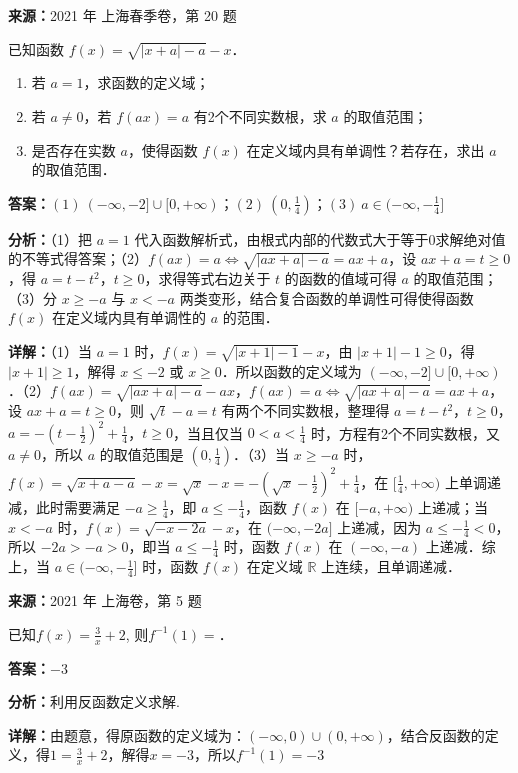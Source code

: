 \begin{question}[points=16]
\textbf{来源：}2021 年 上海春季卷，第 20 题\par
已知函数 $f(x)=\sqrt{|x+a|-a}-x$．\begin{enumerate}\item[(1)] 若 $a=1$，求函数的定义域；\item[(2)] 若 $a\neq 0$，若 $f(ax)=a$ 有2个不同实数根，求 $a$ 的取值范围；\item[(3)] 是否存在实数 $a$，使得函数 $f(x)$ 在定义域内具有单调性？若存在，求出 $a$ 的取值范围．\end{enumerate}
\begin{solution}
\textbf{答案：}$(1)\ (-\infty,-2]\cup[0,+\infty)$；$(2)\ (0,\frac{1}{4})$；$(3)\ a\in(-\infty,-\frac{1}{4}]$

\textbf{分析：}（1）把 $a=1$ 代入函数解析式，由根式内部的代数式大于等于0求解绝对值的不等式得答案；\newline（2）$f(ax)=a\Leftrightarrow\sqrt{|ax+a|-a}=ax+a$，设 $ax+a=t\ge 0$，得 $a=t-t^2$，$t\ge 0$，求得等式右边关于 $t$ 的函数的值域可得 $a$ 的取值范围；\newline（3）分 $x\ge -a$ 与 $x<-a$ 两类变形，结合复合函数的单调性可得使得函数 $f(x)$ 在定义域内具有单调性的 $a$ 的范围．

\textbf{详解：}（1）当 $a=1$ 时，$f(x)=\sqrt{|x+1|-1}-x$，由 $|x+1|-1\ge 0$，得 $|x+1|\ge 1$，解得 $x\le -2$ 或 $x\ge 0$．所以函数的定义域为 $(-\infty,-2]\cup[0,+\infty)$．\newline（2）$f(ax)=\sqrt{|ax+a|-a}-ax$，$f(ax)=a\Leftrightarrow\sqrt{|ax+a|-a}=ax+a$，设 $ax+a=t\ge 0$，则 $\sqrt{t}-a=t$ 有两个不同实数根，整理得 $a=t-t^2$，$t\ge 0$，$a=-(t-\frac{1}{2})^2+\frac{1}{4}$，$t\ge 0$，当且仅当 $0<a<\frac{1}{4}$ 时，方程有2个不同实数根，又 $a\neq 0$，所以 $a$ 的取值范围是 $(0,\frac{1}{4})$．\newline（3）当 $x\ge -a$ 时，$f(x)=\sqrt{x+a-a}-x=\sqrt{x}-x=-(\sqrt{x}-\frac{1}{2})^2+\frac{1}{4}$，在 $[\frac{1}{4},+\infty)$ 上单调递减，此时需要满足 $-a\ge \frac{1}{4}$，即 $a\le -\frac{1}{4}$，函数 $f(x)$ 在 $[-a,+\infty)$ 上递减；当 $x<-a$ 时，$f(x)=\sqrt{-x-2a}-x$，在 $(-\infty,-2a]$ 上递减，因为 $a\le -\frac{1}{4}<0$，所以 $-2a>-a>0$，即当 $a\le -\frac{1}{4}$ 时，函数 $f(x)$ 在 $(-\infty,-a)$ 上递减．综上，当 $a\in(-\infty,-\frac{1}{4}]$ 时，函数 $f(x)$ 在定义域 $\mathbb{R}$ 上连续，且单调递减．
\end{solution}
\end{question}

\begin{question}[points=4]
\textbf{来源：}2021 年 上海卷，第 5 题\par
已知$f(x)=\frac{3}{x}+2$, 则$f^{-1}(1)=$．
\fillin[{$-3$}]
\begin{solution}
\textbf{答案：}$-3$

\textbf{分析：}利用反函数定义求解.

\textbf{详解：}由题意，得原函数的定义域为：$(-\infty,0)\cup(0,+\infty)$，结合反函数的定义，得$1=\frac{3}{x}+2$，解得$x=-3$，所以$f^{-1}(1)=-3$
\end{solution}
\end{question}

